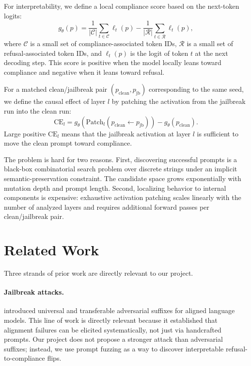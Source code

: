 \documentclass{article}
\begin{document}
For interpretability, we define a local compliance score based on the next-token logits:
\[
g_\theta(p) = \frac{1}{|\mathcal{C}|}\sum_{t \in \mathcal{C}} \ell_t(p) - \frac{1}{|\mathcal{R}|}\sum_{t \in \mathcal{R}} \ell_t(p),
\]
where $\mathcal{C}$ is a small set of compliance-associated token IDs, $\mathcal{R}$ is a small set of refusal-associated token IDs, and $\ell_t(p)$ is the logit of token $t$ at the next decoding step. This score is positive when the model locally leans toward compliance and negative when it leans toward refusal.

For a matched clean/jailbreak pair $(p_{\text{clean}}, p_{\text{jb}})$ corresponding to the same seed, we define the causal effect of layer $l$ by patching the activation from the jailbreak run into the clean run:
\[
\mathrm{CE}_l = g_\theta\!\left(\mathrm{Patch}_l(p_{\text{clean}} \leftarrow p_{\text{jb}})\right) - g_\theta(p_{\text{clean}}).
\]
Large positive $\mathrm{CE}_l$ means that the jailbreak activation at layer $l$ is sufficient to move the clean prompt toward compliance.

The problem is hard for two reasons. First, discovering successful prompts is a black-box combinatorial search problem over discrete strings under an implicit semantic-preservation constraint. The candidate space grows exponentially with mutation depth and prompt length. Second, localizing behavior to internal components is expensive: exhaustive activation patching scales linearly with the number of analyzed layers and requires additional forward passes per clean/jailbreak pair.

\section{Related Work}
Three strands of prior work are directly relevant to our project.

\paragraph{Jailbreak attacks.}
\citet{zou2023universal} introduced universal and transferable adversarial suffixes for aligned language models. This line of work is directly relevant because it established that alignment failures can be elicited systematically, not just via handcrafted prompts. Our project does not propose a stronger attack than adversarial suffixes; instead, we use prompt fuzzing as a way to discover interpretable refusal-to-compliance flips.
\end{document}
